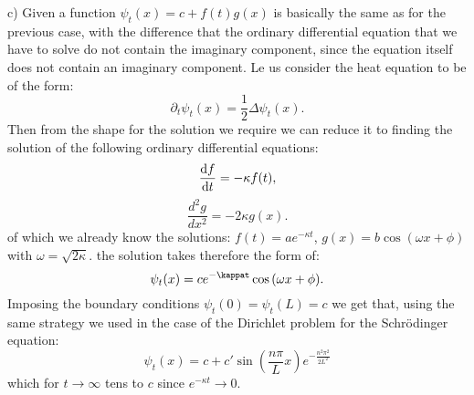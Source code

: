 \documentclass{article}
\begin{document}
c) Given a function $\psi_t(x) = c + f(t)g(x)$ is basically the same as for the previous case, with the difference that the ordinary differential equation that we have to solve do not contain the imaginary component, since the equation itself does not contain an imaginary component. Le us consider the heat equation to be of the form:
\[
    \partial_t \psi_t(x) = \frac{1}{2} \Delta \psi_t (x).
\]
Then from the shape for the solution we require we can reduce it to finding the solution of the following ordinary differential equations:
\[
    \odv{f}{t} =- \kappa f(t) ,
\]
\[
    \frac{d^2 g}{dx^2} = -2 \kappa g(x) .
\]
of which we already know the solutions: $f(t) = a e^{-\kappa t}$, $g(x) = b \cos{(\omega x + \phi)}$ with $\omega = \sqrt{2\kappa}$. the solution takes therefore the form of:
\[
    \psi_t(x) = c e^{-\kappat} \cos{(\omega x + \phi)}.
\]
Imposing the boundary conditions  $\psi_t (0) = \psi_t(L) = c$ we get that, using the same strategy we used in the case of the Dirichlet problem for the Schrödinger equation:
\[
    \psi_t(x) = c + c' \sin{\left(\frac{n\pi}{L} x\right)} e^{-\frac{n^2\pi^2}{2L^2}}
\]
which for $t \to \infty$ tens to $c$ since $e^{-\kappa t} \to 0$.
\end{document}
